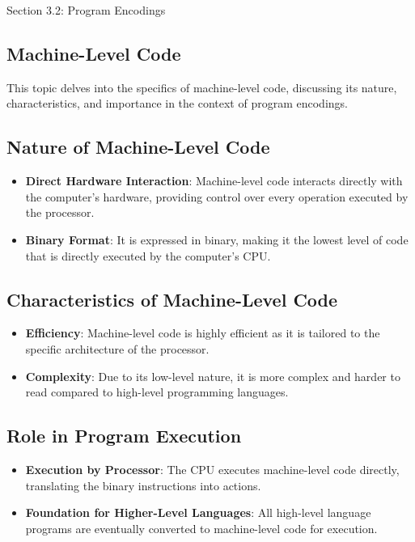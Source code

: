 \begin{notes}{Section 3.2: Program Encodings}
    \subsection*{Machine-Level Code}

    This topic delves into the specifics of machine-level code, discussing its nature, characteristics, and importance in the context of program encodings.
    
    \subsection*{Nature of Machine-Level Code}
    
    \begin{itemize}
        \item \textbf{Direct Hardware Interaction}: Machine-level code interacts directly with the computer's hardware, providing control over every operation executed by the processor.
        \item \textbf{Binary Format}: It is expressed in binary, making it the lowest level of code that is directly executed by the computer's CPU.
    \end{itemize}
    
    \subsection*{Characteristics of Machine-Level Code}
    
    \begin{itemize}
        \item \textbf{Efficiency}: Machine-level code is highly efficient as it is tailored to the specific architecture of the processor.
        \item \textbf{Complexity}: Due to its low-level nature, it is more complex and harder to read compared to high-level programming languages.
    \end{itemize}
    
    \subsection*{Role in Program Execution}
    
    \begin{itemize}
        \item \textbf{Execution by Processor}: The CPU executes machine-level code directly, translating the binary instructions into actions.
        \item \textbf{Foundation for Higher-Level Languages}: All high-level language programs are eventually converted to machine-level code for execution.
    \end{itemize}
    

\end{notes}
